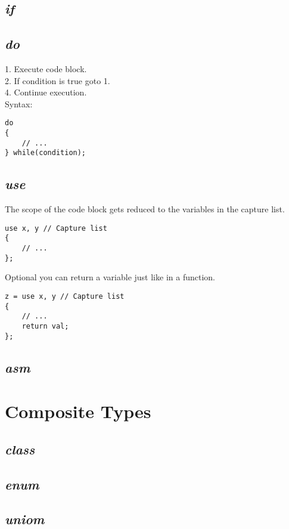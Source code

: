 \documentclass[10pt,a4paper]{article}
\begin{document}
\subsection{\textit{if}}


\subsection{\textit{do}}
1. Execute code block. \\
2. If condition is true goto 1. \\
4. Continue execution. \\
Syntax:
\begin{lstlisting}
do
{
	// ...
} while(condition);
\end{lstlisting}


\subsection{\textit{use}}
The scope of the code block gets reduced to the variables in the capture list.
\begin{lstlisting}
use x, y // Capture list
{
	// ...
};
\end{lstlisting}
Optional you can return a variable just like in a function.
\begin{lstlisting}
z = use x, y // Capture list
{
	// ...
	return val;
};
\end{lstlisting}


\subsection{\textit{asm}}





\section{Composite Types}


\subsection{\textit{class}}


\subsection{\textit{enum}}


\subsection{\textit{uniom}}
\end{document}

